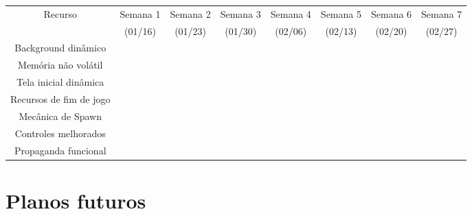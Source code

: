 \begin{adjustbox}{width = \textwidth, caption = {Planejamento escalonado}, nofloat=table, center, angle=90}
        \begin{tabular}{|cccccccc|}
            \cline{1-8}
            \multicolumn{1}{|c|}{Recurso} & \multicolumn{1}{c|}{Semana 1} & \multicolumn{1}{c|}{Semana 2} & \multicolumn{1}{c|}{Semana 3} & \multicolumn{1}{c|}{Semana 4} & \multicolumn{1}{c|}{Semana 5} & \multicolumn{1}{c|}{Semana 6} & Semana 7 \\
            \multicolumn{1}{|c|}{} & \multicolumn{1}{c|}{(01/16)} & \multicolumn{1}{c|}{(01/23)} & \multicolumn{1}{c|}{(01/30)} & \multicolumn{1}{c|}{(02/06)} & \multicolumn{1}{c|}{(02/13)} & \multicolumn{1}{c|}{(02/20)} & (02/27) \\ 
            \cline{1-8} 
            Background dinâmico & & & & & & & \\
            Memória não volátil & & & & & & & \\
            Tela inicial dinâmica & & & & & & & \\
            Recursos de fim de jogo & & & & & & & \\
            Mecânica de Spawn & & & & & & & \\
            Controles melhorados & & & & & & & \\
            Propaganda funcional & & & & & & & \\ \cline{1-8}
        \end{tabular}
\end{adjustbox}

    
\chapter{Planos futuros}



% 
% 




